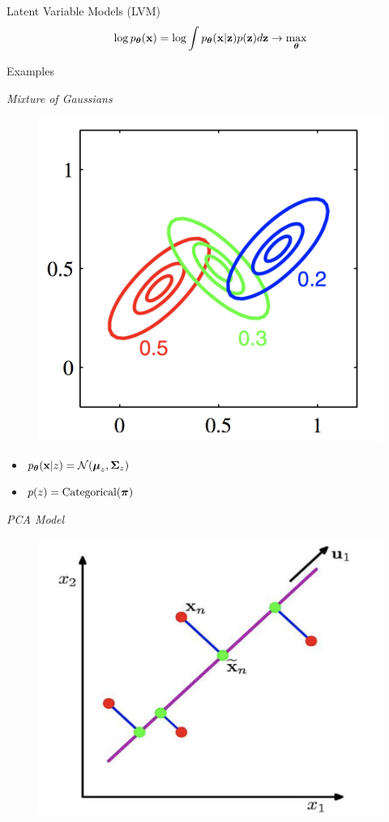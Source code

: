 \documentclass{beamer}
\begin{document}
\begin{frame}{Latent Variable Models (LVM)}
	\[
		\log p_{\boldsymbol{\theta}}(\mathbf{x}) = \log \int p_{\boldsymbol{\theta}}(\mathbf{x} | \mathbf{z}) p(\mathbf{z}) d\mathbf{z} \rightarrow \max_{\boldsymbol{\theta}}
	\]
    \eqpause
	\vspace{-0.6cm}
	\begin{block}{Examples}
		\begin{minipage}[t]{0.45\columnwidth}
			\textit{Mixture of Gaussians} \\
			\vspace{-0.5cm}
			\begin{figure}
				\centering
				\includegraphics[width=0.75\linewidth]{figs/mixture_of_gaussians}
			\end{figure}
			\vspace{-0.5cm}
			\begin{itemize}
				\item $p_{\boldsymbol{\theta}}(\mathbf{x} | z) = \mathcal{N}(\boldsymbol{\mu}_z, \boldsymbol{\Sigma}_z)$
				\item $p(z) = \mathrm{Categorical}(\boldsymbol{\pi})$
			\end{itemize}
		\end{minipage}%
        \eqpause
		\begin{minipage}[t]{0.53\columnwidth}
			\textit{PCA Model} \\
			\vspace{-0.5cm}
			\begin{figure}
				\centering
				\includegraphics[width=.7\linewidth]{figs/pca}

\end{figure}
\end{minipage}
\end{block}
\end{frame}
\end{document}
